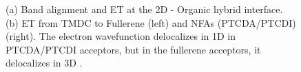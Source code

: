 \documentclass[12pt]{article}
\begin{document}
\begin{figure}[H]
\centering
{} \hspace{20pt}

\caption{(a) Band alignment and ET at the 2D - Organic hybrid interface. (b) ET from TMDC to Fullerene (left) and NFAs (PTCDA/PTCDI) (right). The electron wavefunction delocalizes in 1D in PTCDA/PTCDI acceptors, but in the fullerene acceptors, it delocalizes in 3D \cite{rijal2020collective}.}\label{fig:charge transfer scheme}
\end{figure}
\end{document}
